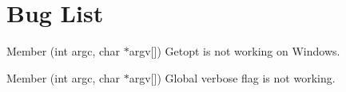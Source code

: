 \chapter{Bug List}
\hypertarget{bug}{}\label{bug}

\begin{DoxyRefList}
\item[Member \doxylink{main_8cpp_a2b2d4ce8b34d14b9e775eaf6214b00e1}{main} (int argc, char \texorpdfstring{$\ast$}{*}argv\mbox{[}\mbox{]})]\label{bug__bug000001}%
%
Getopt is not working on Windows.  
\item[Member \doxylink{classutils_1_1StartupHandler_a9cdd57841cee245c1a1c94b0efe6549c}{utils\+::Startup\+Handler\+::get\+Options} (int argc, char \texorpdfstring{$\ast$}{*}argv\mbox{[}\mbox{]})]\label{bug__bug000002}%
%
 Global verbose flag is not working.
\end{DoxyRefList}